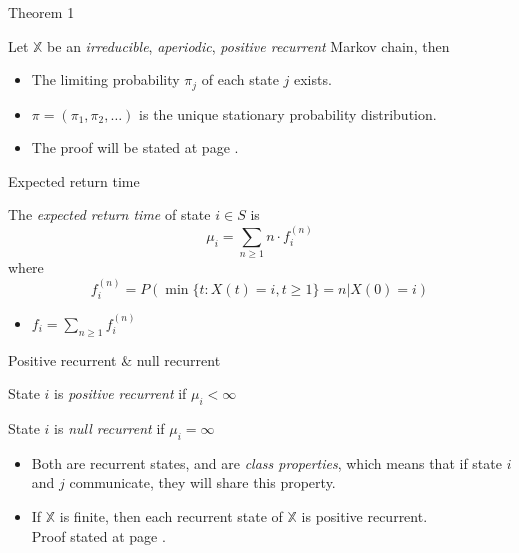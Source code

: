 \documentclass[mathserif]{beamer}
\begin{document}
\begin{frame}{Theorem 1}
	\begin{theorem}
		Let $\mathbb{X}$ be an \textit{irreducible}, \textit{aperiodic}, \textit{positive recurrent} Markov chain, then
		\begin{itemize}
			\item The limiting probability $\pi_j$ of each state $j$ exists.
			\item $\pi = (\pi_1, \pi_2, \ldots)$ is the unique stationary probability distribution.
		\end{itemize}
	\end{theorem}
	\begin{itemize}
		\item The proof will be stated at page \hyperlink{thm1_proof}{\pageref{thm1_proof}}.
	\end{itemize}
\end{frame}

\begin{frame}{Expected return time}
	\begin{definition}
		The \textit{expected return time} of state $i \in S$ is
		\[
		\mu_i = \sum_{n \geq 1} n \cdot f_i^{(n)}
		\]
		where
		\[
		f_i^{(n)} = P(\min\{t:X(t) = i, t\geq 1\} = n | X(0) = i)
		\]
	\end{definition}
	\begin{itemize}
		\item $f_i = \sum_{n \geq 1} f_i^{(n)}$
	\end{itemize}
\end{frame}

\begin{frame}{Positive recurrent \& null recurrent}
	\begin{definition}
		State $i$ is \textit{positive recurrent} if $\mu_i < \infty$
	\end{definition}
	\begin{definition}
		State $i$ is \textit{null recurrent} if $\mu_i = \infty$
	\end{definition}
	\begin{itemize}
		\item Both are recurrent states, and are \textit{class properties}, which means that if state $i$ and $j$ communicate, they will share this property.
		\item If $\mathbb{X}$ is finite, then each recurrent state of $\mathbb{X}$ is positive recurrent.\\
			Proof stated at page \pageref{finite_pos_rec}.
	\end{itemize}
\end{frame}
\end{document}
